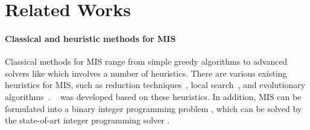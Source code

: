 \section{Related Works}
\label{sec:related-works}

\paragraph{Classical and heuristic methods for MIS}



Classical methods for MIS range from simple greedy algorithms to advanced solvers like \kamis which involves a number of heuristics. There are various existing heuristics for MIS, such as reduction techniques~\citep{butenko2002finding, xiao2013confining, akiba2016branch}, local search~\citep{andrade2012fast}, and evolutionary algorithms~\citep{back1994evolutionary, borisovsky2003experimental, lamm2015graph}. \kamis~\citep{lamm2017finding, dahlum2016accelerating, hespe2019scalable} was developed based on these heuristics. In addition, MIS can be formulated into a binary integer programming problem \citep{nemhauser1975vertex}, which can be solved by the state-of-art integer programming solver \gurobi\cite{gurobi}. 

